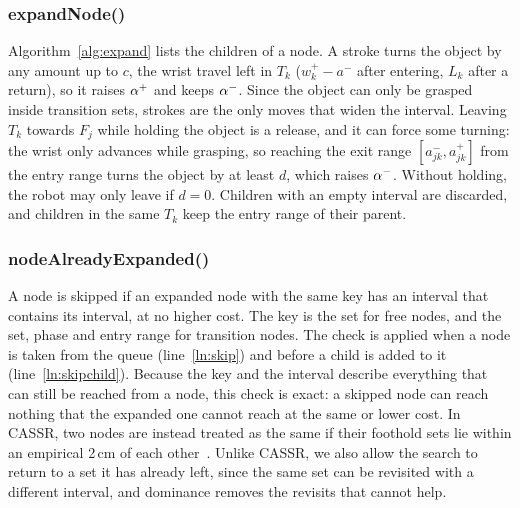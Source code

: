 \subsubsection{expandNode()}
\label{sec:astar:expand}
Algorithm~\ref{alg:expand} lists the children of a node. A stroke turns the
object by any amount up to $c$, the wrist travel left in $T_k$ ($w_k^+-a^-$
after entering, $L_k$ after a return), so it raises $\alpha^{+}$ and keeps $\alpha^{-}$.
Since the object can only be grasped inside transition sets, strokes are the
only moves that widen the interval. Leaving $T_k$ towards $F_j$ while holding
the object is a release, and it can force some turning: the wrist only advances
while grasping, so reaching the exit range $[a_{jk}^-,a_{jk}^+]$ from the entry
range turns the object by at least $d$, which raises $\alpha^{-}$. Without holding,
the robot may only leave if $d=0$. Children with an empty interval are
discarded, and children in the same $T_k$ keep the entry range of their parent.

\subsubsection{nodeAlreadyExpanded()}
\label{sec:astar:dominance}
A node is skipped if an expanded node with the same key has an interval that
contains its interval, at no higher cost. The key is the set for free nodes,
and the set, phase and entry range for transition nodes. The check is applied
when a node is taken from the queue (line~\ref{ln:skip}) and before a child is added to it
(line~\ref{ln:skipchild}). Because the key and the interval describe everything that can still
be reached from a node, this check is exact: a skipped node can reach nothing
that the expanded one cannot reach at the same or lower cost. In CASSR, two
nodes are instead treated as the same if their foothold sets lie within an
empirical 2\,cm of each other~\cite{wang2026cassr}. Unlike CASSR, we also allow
the search to return to a set it has already left, since the same set can be
revisited with a different interval, and dominance removes the revisits that
cannot help.

